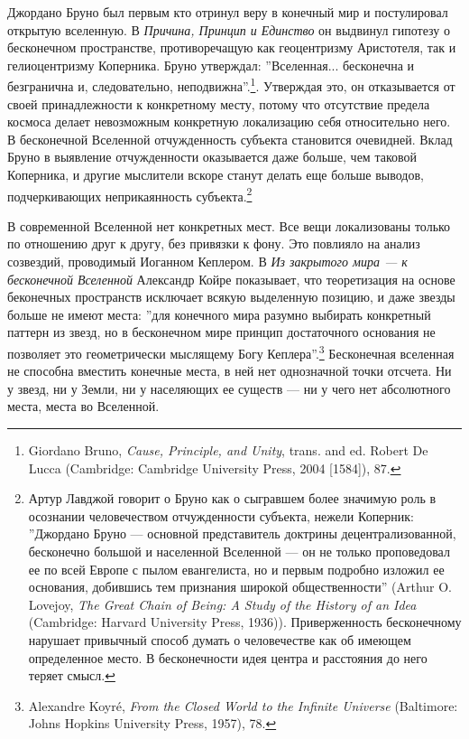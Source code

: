 \documentclass[12pt]{book}
\begin{document}
Джордано Бруно был первым кто отринул веру в конечный мир и постулировал открытую вселенную. В \textit{Причина, Принцип и Единство} он выдвинул гипотезу о бесконечном пространстве, противоречащую как геоцентризму Аристотеля, так и гелиоцентризму Коперника. Бруно утверждал: ''Вселенная... бесконечна и безгранична и, следовательно, неподвижна''.\footnote{Giordano Bruno, \textit{Cause, Principle, and Unity}, trans. and ed. Robert De Lucca (Cambridge: Cambridge University Press, 2004 [1584]), 87.}. Утверждая это, он отказывается от своей принадлежности к конкретному месту, потому что отсутствие предела космоса делает невозможным конкретную локализацию себя относительно него. В бесконечной Вселенной отчужденность субъекта становится очевидней. Вклад Бруно в выявление отчужденности оказывается даже больше, чем таковой Коперника, и другие мыслители вскоре станут делать еще больше выводов, подчеркивающих неприкаянность субъекта.\footnote{Артур Лавджой говорит о Бруно как о сыгравшем более значимую роль в осознании человечеством отчужденности субъекта, нежели Коперник: ''Джордано Бруно --- основной представитель доктрины децентрализованной, бесконечно большой и населенной Вселенной --- он не только проповедовал ее по всей Европе с пылом евангелиста, но и первым подробно изложил ее основания, добившись тем признания широкой общественности'' (Arthur O. Lovejoy, \textit{The Great Chain of Being: A Study of the History of an Idea} (Cambridge: Harvard University Press, 1936)). Приверженность бесконечному нарушает привычный способ думать о человечестве как об имеющем определенное место. В бесконечности идея центра и расстояния до него теряет смысл.}

В современной Вселенной нет конкретных мест. Все вещи локализованы только по отношению друг к другу, без привязки к фону. Это повлияло на анализ созвездий, проводимый Иоганном Кеплером. В \textit{Из закрытого мира --- к бесконечной Вселенной} Александр Койре показывает, что теоретизация на основе беконечных пространств исключает всякую выделенную позицию, и даже звезды больше не имеют места: ''для конечного мира разумно выбирать конкретный паттерн из звезд, но в бесконечном мире принцип достаточного основания не позволяет это геометрически мыслящему Богу Кеплера''.\footnote{Alexandre Koyré, \textit{From the Closed World to the Infinite Universe} (Baltimore: Johns Hopkins University Press, 1957), 78.} Бесконечная вселенная не способна вместить конечные места, в ней нет однозначной точки отсчета. Ни у звезд, ни у Земли, ни у населяющих ее существ --- ни у чего нет абсолютного места, места во Вселенной.
\end{document}
